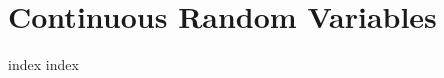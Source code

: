 \chapter{Continuous Random Variables}
\label{ch:cp}
\ifdefined\HCode
\else
{
\startcontents[chapter]
}
\fi

{index}
{index}

\ifdefined\HCode
{}
\fi

\ifdefined\HCode
\else
{
\stopcontents[chapter]
}
\fi

\ifdefined\HCode
{}
\fi
